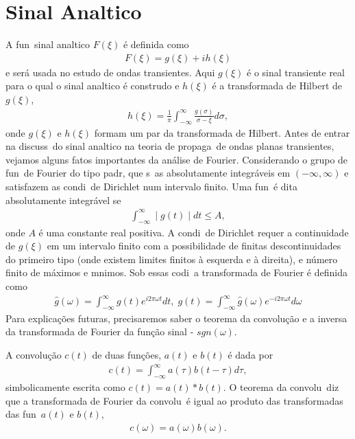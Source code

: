 \section{Sinal Anal\ih tico}

A fun\cao\ sinal anal\ih tico $F(\xi)$ \'e definida como
\begin{eqnarray}
F(\xi) = g(\xi) + ih(\xi)
\end{eqnarray}
e ser\'a usada no estudo de ondas transientes. Aqui $g(\xi)$ \'e o
sinal transiente real para o qual o sinal anal\ih tico \'e
constru\ih do e $h(\xi)$ \'e a transformada de Hilbert de
$g(\xi)$,
\begin{eqnarray}
h(\xi) =
\frac{1}{\pi}\int_{-\infty}^{\infty}\frac{g(\sigma)}{\sigma-\xi}d\sigma,
\end{eqnarray}
onde $g(\xi)$ e $h(\xi)$ formam um par da transformada de Hilbert.
Antes de entrar na discuss\ao\ do sinal anal\ih tico na teoria de
propaga\cao\ de ondas planas transientes, vejamos alguns fatos
importantes da an\'alise de Fourier. Considerando o grupo de
fun\coes\ de Fourier do tipo padr\ao, que s\ao\ as absolutamente
integr\'aveis em $(-\infty,\infty)$ e satisfazem as condi\coes\ de
Dirichlet num intervalo finito. Uma fun\cao\ \'e dita
absolutamente integr\'avel se
\begin{eqnarray}
\int_{-\infty}^{\infty}\mid g(t)\mid dt \leq A,
\end{eqnarray}
onde $A$ \'e uma constante real positiva. A condi\cao\ de
Dirichlet requer a continuidade de $g(\xi)$ em um intervalo finito
com a possibilidade de finitas descontinuidades do primeiro tipo
(onde existem limites finitos \`a esquerda e \`a direita), e
n\'umero finito de m\'aximos e m\ih nimos. Sob essas codi\coes\ a
transformada de Fourier \'e definida como
\begin{eqnarray}
\hat{g}(\omega) = \int_{-\infty}^{\infty}g(t)e^{i 2 \pi \omega t}dt,\; g(t) =
\int_{-\infty}^{\infty}\hat{g}(\omega)e^{-i 2 \pi \omega t}d\omega
\end{eqnarray}
Para explica\c{c}\~oes futuras, precisaremos saber o teorema da
convolu\c{c}\~ao e a inversa da transformada de Fourier da fun\c{c}\~ao
sinal - $sgn(\omega)$. 

A convolu\c{c}\~ao $c(t)$ de duas fun\c{c}\~oes, $a(t)$ e $b(t)$ \'e dada por
\begin{eqnarray}
c(t) = \int_{-\infty}^{\infty} a(\tau)b(t-\tau)d\tau,
\end{eqnarray}
simbolicamente escrita como $c(t) = a(t)*b(t)$. O teorema da
convolu\cao\ diz que a transformada de Fourier da convolu\cao\
\'e igual ao produto das transformadas das fun\coes\ $a(t)$ e
$b(t)$,
\begin{eqnarray}
c(\omega) = a(\omega)b(\omega).
\end{eqnarray}

